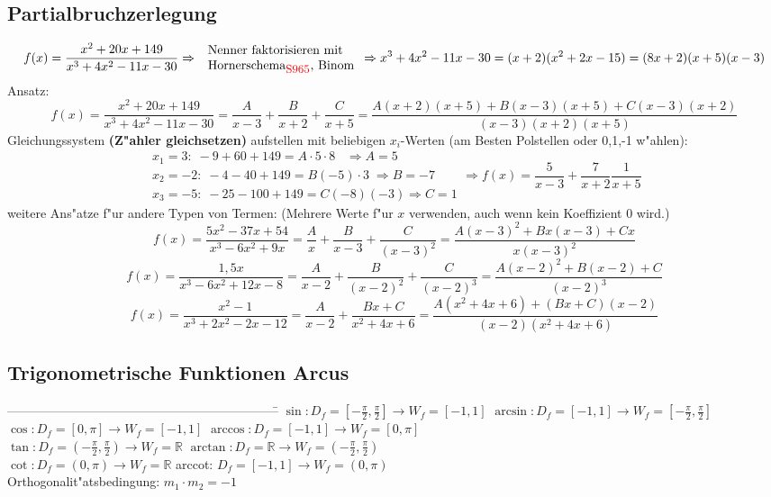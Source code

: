 \begin{flushleft}
		\subsection{Partialbruchzerlegung}
			\[f(x)=\frac{x^2+20x+149}{x^3+4x^2-11x-30} \Rightarrow \; \begin{array}{l}\text{Nenner faktorisieren mit}\\
			\text{Hornerschema$_{\textcolor{red}{\mbox{\small{S965}}}}$, Binom}\end{array} \Rightarrow x^{3}+4x^{2}-11x-30=(x+2)(x^{2}+2x-15)=(8x+2)(x+5)(x-3)\]
			Ansatz:
			\[f(x)=\frac{x^2+20x+149}{x^3+4x^2-11x-30}=\frac{A}{x-3} + \frac{B}{x+2} + \frac{C}{x+5}=
			\frac{A(x+2)(x+5)+B(x-3)(x+5)+C(x-3)(x+2)}{(x-3)(x+2)(x+5)}\]
			Gleichungssystem \textbf{(Z"ahler gleichsetzen)} aufstellen mit beliebigen $x_i$-Werten (am Besten Polstellen oder 0,1,-1 w"ahlen):
			\[\begin{array}{l}x_1=3:\;-9+60+149=A\cdot5\cdot8\;\;\;\Rightarrow A=5\\
			x_2=-2:\;-4-40+149=B(-5)\cdot3\; \Rightarrow B=-7\\
			x_3=-5:\;-25-100+149=C(-8)(-3) \Rightarrow C=1 \end{array} \Rightarrow f(x)=\frac{5}{x-3}+\frac{7}{x+2}\frac{1}{x+5}\]
			weitere Ans"atze f"ur andere Typen von Termen: (Mehrere Werte f"ur $x$ verwenden, auch wenn kein Koeffizient 0 wird.)
			\[f(x)=\frac{5x^2-37x+54}{x^3-6x^2+9x}=\frac{A}{x}+\frac{B}{x-3}+\frac{C}{(x-3)^2}=\frac{A(x-3)^2+Bx(x-3)+Cx}{x(x-3)^2}\]
			\[f(x)=\frac{1,5x}{x^3-6x^2+12x-8}=\frac{A}{x-2}+\frac{B}{(x-2)^2}+\frac{C}{(x-2)^3}=\frac{A(x-2)^2+B(x-2)+C}{(x-2)^3}\]
			\[f(x)=\frac{x^2-1}{x^3+2x^2-2x-12}=\frac{A}{x-2}+\frac{Bx+C}{x^2+4x+6}=\frac{A(x^2+4x+6)+(Bx+C)(x-2)}{(x-2)(x^2+4x+6)}\]
							
		\subsection{Trigonometrische Funktionen Arcus}
			\begin{tabbing}
				-----------------------------------------------------------------\= \kill
				$\sin: D_f=[-\frac{\pi}{2},\frac{\pi}{2}]\rightarrow W_f=[-1,1]$ \> $\arcsin: D_f=[-1,1]\rightarrow W_f=[-\frac{\pi}{2},\frac{\pi}{2}]$\\
				$\cos: D_f=[0,\pi]\rightarrow W_f=[-1,1]$ \> $\arccos: D_f=[-1,1]\rightarrow W_f=[0,\pi]$\\
				$\tan: D_f=(-\frac{\pi}{2},\frac{\pi}{2})\rightarrow W_f=\mathbb{R}$ \> $\arctan: D_f=\mathbb{R}\rightarrow W_f=(-\frac{\pi}{2},\frac{\pi}{2})$\\
				$\cot: D_f=(0,\pi)\rightarrow W_f=\mathbb{R}$ \> arccot: $D_f=[-1,1]\rightarrow W_f=(0,\pi)$\\											
				Orthogonalit"atsbedingung: $m_1 \cdot m_2 = -1$
			\end{tabbing}



\end{flushleft}
